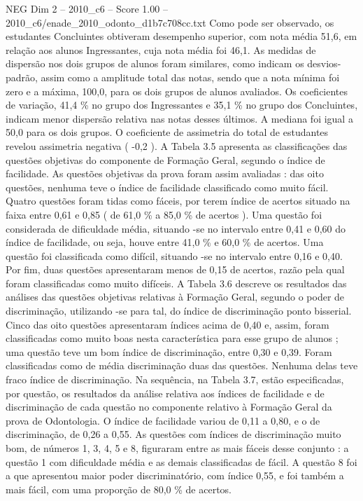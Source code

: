 \begin{textsample}{NEG Dim 2 – 2010\_c6 – Score 1.00 – 2010\_c6/enade\_2010\_odonto\_d1b7c708cc.txt}
Como pode ser observado, os estudantes Concluintes obtiveram desempenho superior, com nota média 51,6, em relação aos alunos Ingressantes, cuja nota média foi 46,1.
As medidas de dispersão nos dois grupos de alunos foram similares, como indicam os desvios-padrão, assim como a amplitude total das notas, sendo que a nota mínima foi zero e a máxima, 100,0, para os dois grupos de alunos avaliados.
Os coeficientes de variação, 41,4 \% no grupo dos Ingressantes e 35,1 \% no grupo dos Concluintes, indicam menor dispersão relativa nas notas desses últimos.
A mediana foi igual a 50,0 para os dois grupos.
O coeficiente de assimetria do total de estudantes revelou assimetria negativa ( -0,2 ).
A Tabela 3.5 apresenta as classificações das questões objetivas do componente de Formação Geral, segundo o índice de facilidade.
As questões objetivas da prova foram assim avaliadas : das oito questões, nenhuma teve o índice de facilidade classificado como muito fácil.
Quatro questões foram tidas como fáceis, por terem índice de acertos situado na faixa entre 0,61 e 0,85 ( de 61,0 \% a 85,0 \% de acertos ).
Uma questão foi considerada de dificuldade média, situando -se no intervalo entre 0,41 e 0,60 do índice de facilidade, ou seja, houve entre 41,0 \% e 60,0 \% de acertos.
Uma questão foi classificada como difícil, situando -se no intervalo entre 0,16 e 0,40.
Por fim, duas questões apresentaram menos de 0,15 de acertos, razão pela qual foram classificadas como muito difíceis.
A Tabela 3.6 descreve os resultados das análises das questões objetivas relativas à Formação Geral, segundo o poder de discriminação, utilizando -se para tal, do índice de discriminação ponto bisserial.
Cinco das oito questões apresentaram índices acima de 0,40 e, assim, foram classificadas como muito boas nesta característica para esse grupo de alunos ; uma questão teve um bom índice de discriminação, entre 0,30 e 0,39.
Foram classificadas como de média discriminação duas das questões.
Nenhuma delas teve fraco índice de discriminação.
Na sequência, na Tabela 3.7, estão especificadas, por questão, os resultados da análise relativa aos índices de facilidade e de discriminação de cada questão no componente relativo à Formação Geral da prova de Odontologia.
O índice de facilidade variou de 0,11 a 0,80, e o de discriminação, de 0,26 a 0,55.
As questões com índices de discriminação muito bom, de números 1, 3, 4, 5 e 8, figuraram entre as mais fáceis desse conjunto : a questão 1 com dificuldade média e as demais classificadas de fácil.
A questão 8 foi a que apresentou maior poder discriminatório, com índice 0,55, e foi também a mais fácil, com uma proporção de 80,0 \% de acertos.

\end{textsample}
